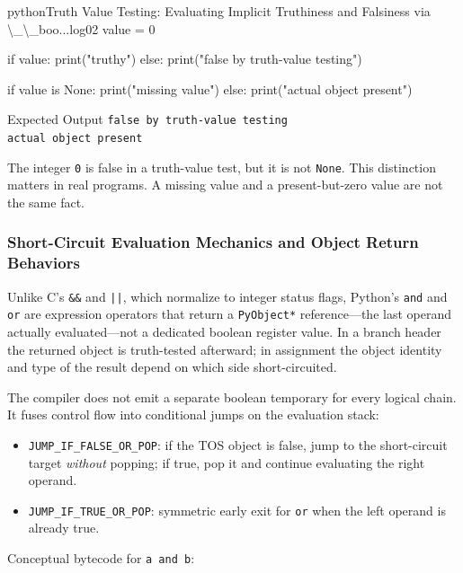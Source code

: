 \begin{codebox}[]{python}{Truth Value Testing: Evaluating Implicit Truthiness and Falsiness via \textbackslash{}\_\textbackslash{}\_boo...}{log02}
value = 0

if value:
    print("truthy")
else:
    print("false by truth-value testing")

if value is None:
    print("missing value")
else:
    print("actual object present")
\end{codebox}


\begin{iobox}{Expected Output}
\texttt{false by truth-value testing} \\
\texttt{actual object present} \\
\end{iobox}


The integer \texttt{0} is false in a truth-value test, but it is not \texttt{None}. This distinction matters in real programs. A missing value and a present-but-zero value are not the same fact.

\subsubsection{Short-Circuit Evaluation Mechanics and Object Return Behaviors}

Unlike C's \texttt{\&\&} and \texttt{||}, which normalize to integer status flags, Python's \texttt{and} and \texttt{or} are expression operators that return a \texttt{PyObject*} reference---the last operand actually evaluated---not a dedicated boolean register value. In a branch header the returned object is truth-tested afterward; in assignment the object identity and type of the result depend on which side short-circuited.

The compiler does not emit a separate boolean temporary for every logical chain. It fuses control flow into conditional jumps on the evaluation stack:

\begin{itemize}
    \item \texttt{JUMP\_IF\_FALSE\_OR\_POP}: if the TOS object is false, jump to the short-circuit target \emph{without} popping; if true, pop it and continue evaluating the right operand.
    \item \texttt{JUMP\_IF\_TRUE\_OR\_POP}: symmetric early exit for \texttt{or} when the left operand is already true.
\end{itemize}

Conceptual bytecode for \texttt{a and b}:

